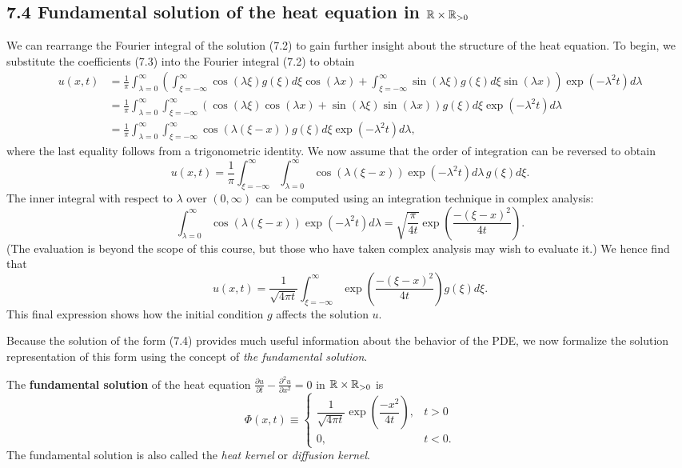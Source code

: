 \subsection{7.4 Fundamental solution of the heat equation in $\mathbb{R} \times \mathbb{R}_{>0}$}
We can rearrange the Fourier integral of the solution (7.2) to gain further insight about the structure of the heat equation. To begin, we substitute the coefficients (7.3) into the Fourier integral (7.2) to obtain
\begin{align*}
    u(x, t) &= \frac{1}{\pi} \int_{\lambda=0}^{\infty} \left(\int_{\xi=-\infty}^{\infty} \cos(\lambda\xi) g(\xi) d\xi \cos(\lambda x) + \int_{\xi=-\infty}^{\infty} \sin(\lambda\xi) g(\xi) d\xi \sin(\lambda x)\right) \exp(-\lambda^2 t) d\lambda \\
    &= \frac{1}{\pi} \int_{\lambda=0}^{\infty} \int_{\xi=-\infty}^{\infty} \left(\cos(\lambda\xi) \cos(\lambda x) + \sin(\lambda\xi) \sin(\lambda x)\right) g(\xi) d\xi \exp(-\lambda^2 t) d\lambda \\
    &= \frac{1}{\pi} \int_{\lambda=0}^{\infty} \int_{\xi=-\infty}^{\infty} \cos(\lambda(\xi - x)) g(\xi) d\xi \exp(-\lambda^2 t) d\lambda,
\end{align*}
where the last equality follows from a trigonometric identity. We now assume that the order of integration can be reversed to obtain
\[u(x, t) = \frac{1}{\pi} \int_{\xi=-\infty}^{\infty} \int_{\lambda=0}^{\infty} \cos(\lambda(\xi - x)) \exp(-\lambda^2 t) d\lambda\, g(\xi) d\xi.\]
The inner integral with respect to $\lambda$ over $(0, \infty)$ can be computed using an integration technique in complex analysis:
\[\int_{\lambda=0}^{\infty} \cos(\lambda(\xi - x)) \exp(-\lambda^2 t) d\lambda = \sqrt{\frac{\pi}{4t}} \exp\left(\frac{-(\xi - x)^2}{4t}\right).\]
(The evaluation is beyond the scope of this course, but those who have taken complex analysis may wish to evaluate it.) We hence find that
\begin{equation*}
    u(x, t) = \frac{1}{\sqrt{4\pi t}} \int_{\xi=-\infty}^{\infty} \exp\left(\frac{-(\xi - x)^2}{4t}\right) g(\xi) d\xi. \tag{7.4}
\end{equation*}
This final expression shows how the initial condition $g$ affects the solution $u$.

Because the solution of the form (7.4) provides much useful information about the behavior of the PDE, we now formalize the solution representation of this form using the concept of \textit{the fundamental solution}.

\begin{definition}
    The \textbf{fundamental solution} of the heat equation $\frac{\partial u}{\partial t} - \frac{\partial^2 u}{\partial x^2} = 0$ in $\mathbb{R} \times \mathbb{R}_{>0}$ is
    \[\Phi(x, t) \equiv \begin{cases} \dfrac{1}{\sqrt{4\pi t}} \exp\left(\dfrac{-x^2}{4t}\right), & t > 0 \\ 0, & t < 0. \end{cases}\]
    The fundamental solution is also called the \textit{heat kernel} or \textit{diffusion kernel}.
\end{definition}

